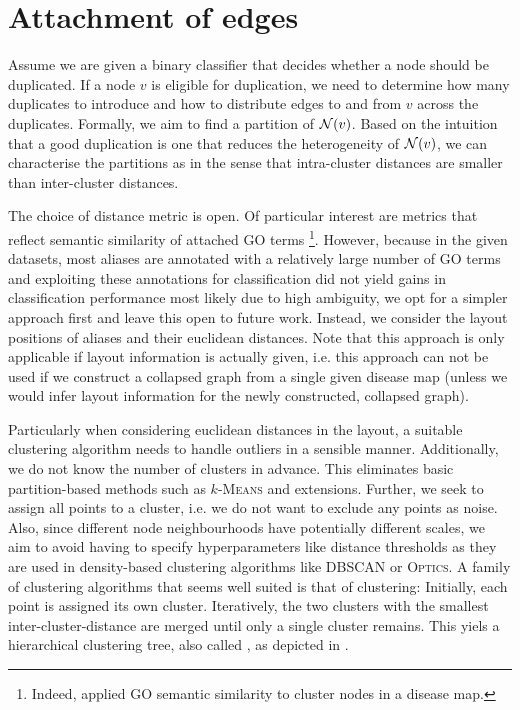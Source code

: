 \documentclass[
	fontsize=10pt, %
	twoside=false, %
	secnumdepth=1, %
]{kaobook}
\begin{document}




\section{Attachment of edges}
\label{sec:edge attachment}


Assume we are given a binary classifier that decides whether a node should be
duplicated. If a node $v$ is eligible for duplication, we need to determine how
many duplicates to introduce and how to distribute edges to and from $v$ across
the duplicates. Formally, we aim to find a partition of $\mathcal{N}(v)$. Based on
the intuition that a good duplication is one that reduces the heterogeneity of
$\mathcal{N}(v)$, we can characterise the partitions as  in the sense
that intra-cluster distances are smaller than inter-cluster distances.

The choice of distance metric is open. Of particular interest are metrics that
reflect semantic similarity of attached GO terms \footnote{ Indeed,
  \citeauthor{ostaszewski_ClusteringApproachesVisual_2018} applied GO semantic
  similarity to cluster nodes in a disease map. }. However, because in the given
datasets, most aliases are annotated with a relatively large number of GO terms
and exploiting these annotations for classification did not yield gains in
classification performance most likely due to high ambiguity, we opt for a
simpler approach first and leave this open to future work. %
Instead, we consider the layout positions of aliases and their euclidean
distances. Note that this approach is only applicable if layout information is
actually given, i.e. this approach can not be used if we construct a collapsed
graph from a single given disease map (unless we would infer layout information
for the newly constructed, collapsed graph).

Particularly when considering euclidean distances in the layout, a suitable
clustering algorithm needs to handle outliers in a sensible manner.
Additionally, we do not know the number of clusters in advance. This eliminates
basic partition-based methods such as $k$-\textsc{Means} and extensions.
%
Further, we seek to assign all points to a cluster, i.e. we do not want to
exclude any points as noise. Also, since different node neighbourhoods have
potentially different scales, we aim to avoid having to specify hyperparameters
like distance thresholds as they are used in density-based clustering algorithms
like \textsc{DBSCAN} or \textsc{Optics}.
%
A family of clustering algorithms that seems well suited is that of
 clustering: Initially, each point is assigned its own
cluster. Iteratively, the two clusters with the smallest inter-cluster-distance
are merged until only a single cluster remains. This yiels a hierarchical
clustering tree, also called , as depicted in .
\end{document}
